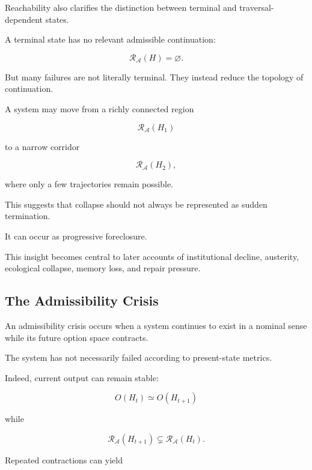 \documentclass[11pt]{article}
\theoremstyle{remark}
\newcommand{\Adm}{\mathcal{A}}
\newcommand{\Reach}{\mathcal{R}}
\begin{document}
Reachability also clarifies the distinction between terminal and traversal-dependent states.

A terminal state has no relevant admissible continuation:

\begin{equation}
\Reach_{\Adm}(H)
=
\varnothing.
\end{equation}

But many failures are not literally terminal. They instead reduce the topology of continuation.

A system may move from a richly connected region

\begin{equation}
\Reach_{\Adm}(H_1)
\end{equation}

to a narrow corridor

\begin{equation}
\Reach_{\Adm}(H_2),
\end{equation}

where only a few trajectories remain possible.

This suggests that collapse should not always be represented as sudden termination.

It can occur as progressive foreclosure.

This insight becomes central to later accounts of institutional decline, austerity, ecological collapse, memory loss, and repair pressure.

\subsection{The Admissibility Crisis}

An admissibility crisis occurs when a system continues to exist in a nominal sense while its future option space contracts.

The system has not necessarily failed according to present-state metrics.

Indeed, current output can remain stable:

\begin{equation}
O(H_t)
\simeq
O(H_{t+1})
\end{equation}

while

\begin{equation}
\Reach_{\Adm}(H_{t+1})
\subsetneq
\Reach_{\Adm}(H_t).
\end{equation}

Repeated contractions can yield
\end{document}
